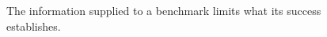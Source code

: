 \begin{figure}[H]
\centering
{}
\caption{The information supplied to a benchmark limits what its success establishes.}\label{fig:teach-P-02-literature-07}
\end{figure}

